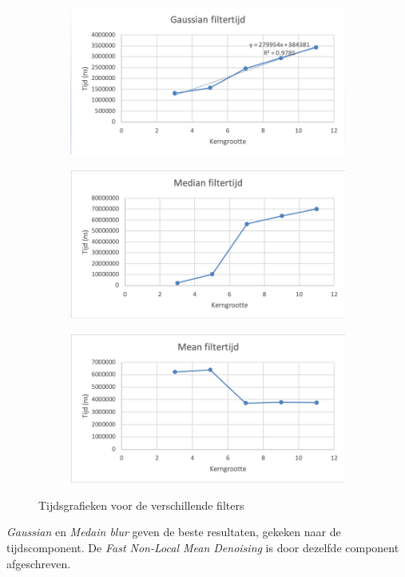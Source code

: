  \begin{figure}[h!]
  \centering
  \begin{subfigure}{0.4\linewidth}
    \includegraphics[width=\linewidth]{img/gaussiantijd}
  \end{subfigure}
  \begin{subfigure}{0.4\linewidth}
    \includegraphics[width=\linewidth]{img/mediantijd}
  \end{subfigure}
  \begin{subfigure}{0.4\linewidth}
    \includegraphics[width=\linewidth]{img/meantijd}
  \end{subfigure}
  \caption{Tijdsgrafieken voor de verschillende filters}
  \label{fig:tijdsgrafieken}
\end{figure}

{\it Gaussian} en {\it Medain blur} geven de beste resultaten, gekeken naar de tijdscomponent.  De \textit{Fast Non-Local Mean Denoising} is door dezelfde component afgeschreven.



